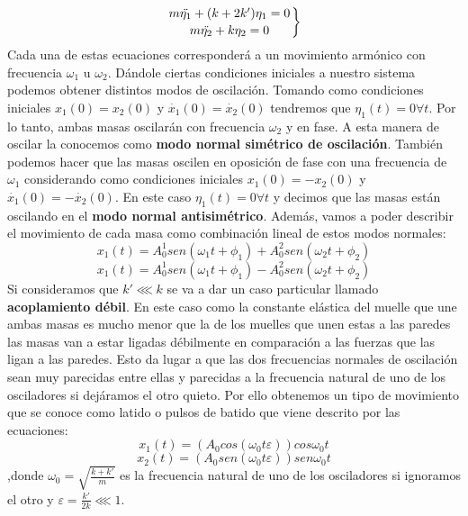 \documentclass{article}
\begin{document}
\begin{equation}\left.
m\ddot{\eta_1} + (k+2k')\eta_1 = 0\atop
m\ddot{\eta_2} + k\eta_2 = 0
\right\}\end{equation}
Cada una de estas ecuaciones corresponderá a un movimiento armónico con frecuencia $\omega_1$ u $\omega_2$. Dándole ciertas condiciones iniciales a nuestro sistema podemos  obtener distintos modos de oscilación.\newline\linebreak
Tomando como condiciones iniciales $x_1(0)=x_2(0)$ y $\dot{x_1}(0)=\dot{x_2}(0)$ tendremos que $\eta_1(t) = 0 \forall t$. Por lo tanto, ambas masas oscilarán con frecuencia $\omega_2$ y en fase. A esta manera de oscilar la conocemos como \textbf{modo normal simétrico de oscilación}.\newline\linebreak
También podemos hacer que las masas oscilen en oposición de fase con una frecuencia de $\omega_1$ considerando como condiciones iniciales $x_1(0)=-x_2(0)$ y $\dot{x_1}(0)=-\dot{x_2}(0)$. En este caso $\eta_1(t) = 0 \forall t$ y decimos que las masas están oscilando en el \textbf{modo normal antisimétrico}.\newline\linebreak
Además, vamos a poder describir el movimiento de cada masa como combinación lineal de estos modos normales:
\begin{equation}
x_1(t) = A_0^1sen(\omega_1t+\phi_1)+A_0^2sen(\omega_2t+\phi_2)
\end{equation}
\begin{equation}
x_1(t) = A_0^1sen(\omega_1t+\phi_1)-A_0^2sen(\omega_2t+\phi_2)
\end{equation}
Si consideramos que $k'\lll k$ se va a dar un caso particular llamado \textbf{acoplamiento débil}. En este caso como la constante elástica del muelle que une ambas masas es mucho menor que la de los muelles que unen estas a las paredes las masas van a estar ligadas débilmente en comparación a las fuerzas que las ligan a las paredes.\newline\linebreak
Esto da lugar a que las dos frecuencias normales de oscilación sean muy parecidas entre ellas y parecidas a la frecuencia natural de uno de los osciladores si dejáramos el otro quieto. Por ello obtenemos un tipo de movimiento que se conoce como latido o pulsos de batido que viene descrito por las ecuaciones:
\begin{equation}x_1(t)=\left(A_0cos(\omega_0 t\varepsilon)\right)cos\omega_0t\label{ec.:9}\end{equation}
\begin{equation}x_2(t)=\left(A_0sen(\omega_0 t\varepsilon)\right)sen\omega_0t\label{ec.:10}\end{equation},donde $\omega_0=\sqrt{\frac{k+k'}{m}}$ es la frecuencia natural de uno de los osciladores si ignoramos el otro y $\varepsilon = \frac{k'}{2k}\lll 1$.\newline\linebreak
\end{document}

